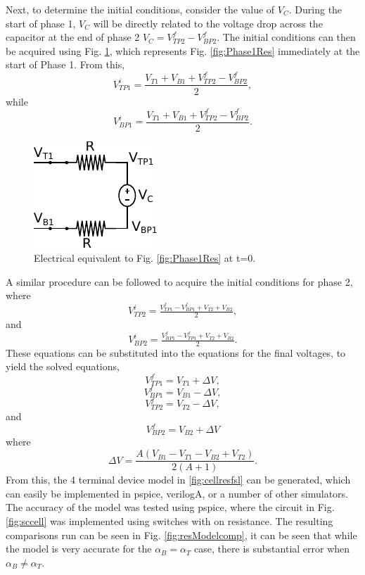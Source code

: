 	Next, to determine the initial conditions, consider the value of $V_{C}$. During the start of phase 1, $V_C$ will be directly related to the voltage drop across the capacitor at the end of phase 2 $V_C = V_{TP2}^f - V_{BP2}^f$. The initial conditions can then be acquired using Fig. \ref{fig:Phase1_t0}, which represents Fig. \ref{fig:Phase1Res} immediately at the start of Phase 1. From this,
	\begin{equation}
		V_{TP1}^i = \frac{V_{T1} + V_{B1} + V_{TP2}^f - V_{BP2}^f}{2},
	\end{equation}
	while 
	\begin{equation}
		V_{BP1}^i = \frac{V_{T1} + V_{B1} + V_{TP2}^f - V_{BP2}^f}{2}.
	\end{equation}
	\begin{figure}
		\centering
		\includegraphics[width=0.3\linewidth]{4Terminal/Figures/Phase1EQ_t=0.pdf}
		\caption{Electrical equivalent to Fig. \ref{fig:Phase1Res} at t=0.}
		\label{fig:Phase1_t0}
	\end{figure}
	A similar procedure can be followed to acquire the initial conditions for phase 2, where
	\begin{equation}
		V_{TP2}^i = \tfrac{V_{TP1}^f - V_{BP1}^f + V_{T2} + V_{B2}}{2},
	\end{equation}
	and
	\begin{equation}
		V_{BP2}^i = \tfrac{V_{BP1}^f - V_{TP1}^f + V_{T2} + V_{B2}}{2}.
	\end{equation}
	These equations can be substituted into the equations for the final voltages, to yield the solved equations,
	\begin{equation}
		V_{TP1}^f = V_{T1} + \Delta V, 
	\end{equation}
	\begin{equation}
		V_{BP1}^f = V_{B1} - \Delta V,
	\end{equation}
	\begin{equation}
		V_{TP2}^f = V_{T2} - \Delta V,
	\end{equation}
	and
	\begin{equation}
		V_{BP2}^f = V_{B2} + \Delta V
	\end{equation}
	where 
	\begin{equation}
		\Delta V = \frac{A(V_{B1} - V_{T1} - V_{B2} + V_{T2})}{2(A+1)}.
	\end{equation}
	From this, the 4 terminal device model in \ref{fig:cellresfsl} can be generated, which can easily be implemented in pspice, verilogA, or a number of other simulators. The accuracy of the model was tested using pspice, where the circuit in Fig. \ref{fig:sccell} was implemented using switches with on resistance. The resulting comparisons run can be seen in Fig. \ref{fig:resModelcomp}, it can be seen that while the model is very accurate for the $\alpha_B = \alpha_T$ case, there is substantial error when $\alpha_B \not= \alpha_T$. 
	
